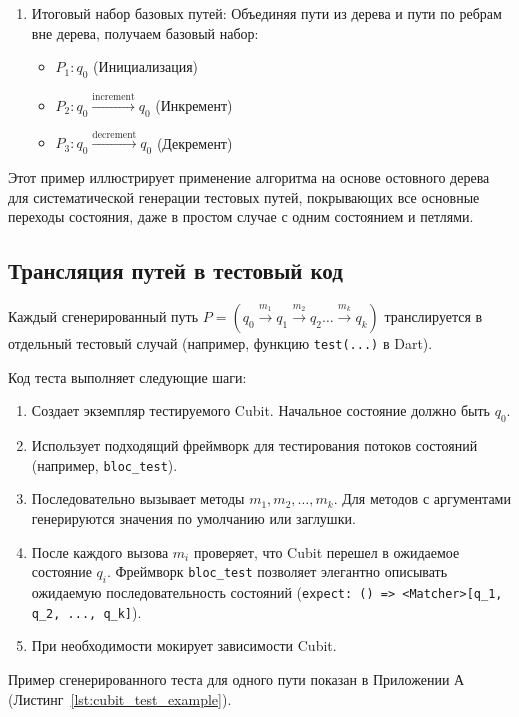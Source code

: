 \documentclass[14pt, russian]{scrartcl}
\begin{document}
\begin{enumerate}
    \item {Итоговый набор базовых путей:} Объединяя пути из дерева и пути по ребрам вне дерева, получаем базовый набор:
        \begin{itemize}
            \item $P_1: q_0$ (Инициализация)
            \item $P_2: q_0 \xrightarrow{\text{increment}} q_0$ (Инкремент)
            \item $P_3: q_0 \xrightarrow{\text{decrement}} q_0$ (Декремент)
        \end{itemize}
\end{enumerate}

Этот пример иллюстрирует применение алгоритма на основе остовного дерева для систематической генерации тестовых путей, покрывающих все основные переходы состояния, даже в простом случае с одним состоянием и петлями.



\subsection{Трансляция путей в тестовый код}

Каждый сгенерированный путь $P = (q_0 \xrightarrow{m_1} q_1 \xrightarrow{m_2} q_2 \dots \xrightarrow{m_k} q_k)$ транслируется в отдельный тестовый случай (например, функцию \texttt{test(...)} в Dart).

Код теста выполняет следующие шаги:
\begin{enumerate}
    \item Создает экземпляр тестируемого Cubit. Начальное состояние должно быть $q_0$.
    \item Использует подходящий фреймворк для тестирования потоков состояний (например, \texttt{bloc\_test}).
    \item Последовательно вызывает методы $m_1, m_2, \dots, m_k$. Для методов с аргументами генерируются значения по умолчанию или заглушки.
    \item После каждого вызова $m_i$ проверяет, что Cubit перешел в ожидаемое состояние $q_i$. Фреймворк \texttt{bloc\_test} позволяет элегантно описывать ожидаемую последовательность состояний (\texttt{expect: () => <Matcher>[q\_1, q\_2, ..., q\_k]}).
    \item При необходимости мокирует зависимости Cubit.
\end{enumerate}

Пример сгенерированного теста для одного пути показан в Приложении А (Листинг~\ref{lst:cubit_test_example}).
\end{document}
